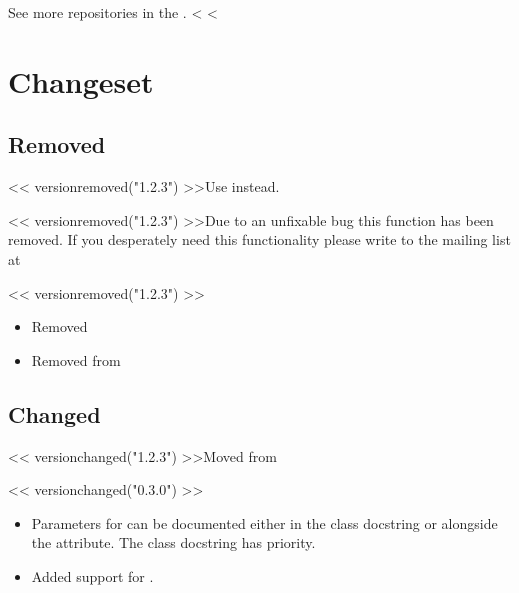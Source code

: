 \documentclass[letterpaper,10pt,english]{sphinxmanual}
\begin{document}
See more repositories in the .
<%
\sphinxstepscope
<%

\chapter{Changeset}
\label{\detokenize{changeset:changeset}}\label{\detokenize{changeset::doc}}

\section{Removed}
\label{\detokenize{changeset:removed}}
<< versionremoved("1.2.3") >>Use {\hyperref[\detokenize{index:foo}]{}} instead.

<< versionremoved("1.2.3") >>Due to an unfixable bug this function has been removed.
If you desperately need this functionality please write to the mailing list at


<< versionremoved("1.2.3") >>\begin{itemize}
\item {}
Removed 

\item {}
Removed  from 

\end{itemize}


\section{Changed}
\label{\detokenize{changeset:changed}}
<< versionchanged("1.2.3") >>Moved from 


<< versionchanged("0.3.0") >>\begin{itemize}
\item {}
Parameters for  can be documented either in the class docstring
or alongside the attribute.
The class docstring has priority.

\item {}
Added support for .

\end{itemize}
\end{document}
